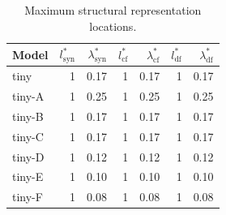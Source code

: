 \begin{table}[t]
\centering
\caption{Maximum structural representation locations.}
\label{tab:peaks}
\begin{tabular}{lrrrrrr}
\toprule
Model & $l^{*}_{\mathrm{syn}}$ & $\lambda^{*}_{\mathrm{syn}}$ & $l^{*}_{\mathrm{cf}}$ & $\lambda^{*}_{\mathrm{cf}}$ & $l^{*}_{\mathrm{df}}$ & $\lambda^{*}_{\mathrm{df}}$ \\
\midrule
tiny & 1 & 0.17 & 1 & 0.17 & 1 & 0.17 \\
tiny-A & 1 & 0.25 & 1 & 0.25 & 1 & 0.25 \\
tiny-B & 1 & 0.17 & 1 & 0.17 & 1 & 0.17 \\
tiny-C & 1 & 0.17 & 1 & 0.17 & 1 & 0.17 \\
tiny-D & 1 & 0.12 & 1 & 0.12 & 1 & 0.12 \\
tiny-E & 1 & 0.10 & 1 & 0.10 & 1 & 0.10 \\
tiny-F & 1 & 0.08 & 1 & 0.08 & 1 & 0.08 \\
\bottomrule
\end{tabular}
\end{table}

